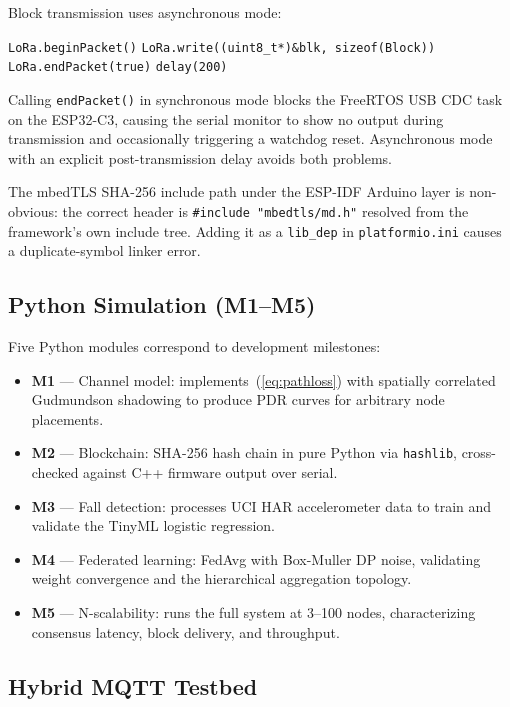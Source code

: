\documentclass[journal]{IEEEtran}
\begin{document}
Block transmission uses asynchronous mode:
\begin{algorithmic}[1]
\STATE \texttt{LoRa.beginPacket()}
\STATE \texttt{LoRa.write((uint8\_t*)\&blk, sizeof(Block))}
\STATE \texttt{LoRa.endPacket(true)} 
\STATE \texttt{delay(200)} 
\end{algorithmic}
Calling \texttt{endPacket()} in synchronous mode blocks the FreeRTOS USB
CDC task on the ESP32-C3, causing the serial monitor to show no output
during transmission and occasionally triggering a watchdog reset.
Asynchronous mode with an explicit post-transmission delay avoids both
problems.

The mbedTLS SHA-256 include path under the ESP-IDF Arduino layer is
non-obvious: the correct header is \texttt{\#include "mbedtls/md.h"}
resolved from the framework's own include tree. Adding it as a
\texttt{lib\_dep} in \texttt{platformio.ini} causes a duplicate-symbol
linker error.

\subsection{Python Simulation (M1--M5)}

Five Python modules correspond to development milestones:
\begin{itemize}
\item \textbf{M1} — Channel model: implements~(\ref{eq:pathloss}) with
  spatially correlated Gudmundson shadowing \cite{Gudmundson1991} to
  produce PDR curves for arbitrary node placements.
\item \textbf{M2} — Blockchain: SHA-256 hash chain in pure Python via
  \texttt{hashlib}, cross-checked against C++ firmware output over serial.
\item \textbf{M3} — Fall detection: processes UCI HAR accelerometer data
  \cite{Anguita2013} to train and validate the TinyML logistic regression.
\item \textbf{M4} — Federated learning: FedAvg with Box-Muller DP noise,
  validating weight convergence and the hierarchical aggregation topology.
\item \textbf{M5} — N-scalability: runs the full system at 3--100 nodes,
  characterizing consensus latency, block delivery, and throughput.
\end{itemize}

\subsection{Hybrid MQTT Testbed}
\end{document}
